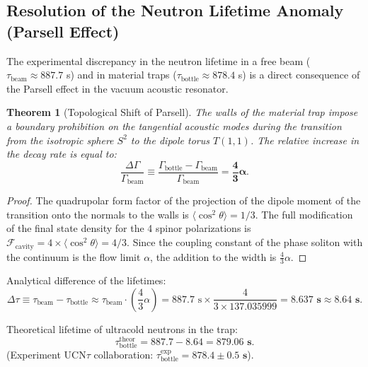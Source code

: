 \documentclass[12pt,a4paper]{article}
\newtheorem{theorem}{Theorem}
\begin{document}
\subsection{Resolution of the Neutron Lifetime Anomaly (Parsell Effect)}
The experimental discrepancy in the neutron lifetime in a free beam ($\tau_{\text{beam}} \approx 887.7$ s) and in material traps ($\tau_{\text{bottle}} \approx 878.4$ s) is a direct consequence of the Parsell effect in the vacuum acoustic resonator.

\begin{theorem}[Topological Shift of Parsell]
The walls of the material trap impose a boundary prohibition on the tangential acoustic modes during the transition from the isotropic sphere $S^2$ to the dipole torus $T(1,1)$. The relative increase in the decay rate is equal to:
\begin{equation}
\frac{\Delta \Gamma}{\Gamma_{\mathrm{beam}}} \equiv \frac{\Gamma_{\mathrm{bottle}} - \Gamma_{\mathrm{beam}}}{\Gamma_{\mathrm{beam}}} = \mathbf{\frac{4}{3} \alpha}.
\end{equation}
\end{theorem}
															
\begin{proof}
The quadrupolar form factor of the projection of the dipole moment of the transition onto the normals to the walls is $\langle \cos^2\theta \rangle = 1/3$. The full modification of the final state density for the 4 spinor polarizations is $\mathcal{F}_{\text{cavity}} = 4 \times \langle \cos^2\theta \rangle = 4/3$. Since the coupling constant of the phase soliton with the continuum is the flow limit $\alpha$, the addition to the width is $\frac{4}{3}\alpha$.
\end{proof}
															
Analytical difference of the lifetimes:
\begin{equation}
\Delta \tau \equiv \tau_{\text{beam}} - \tau_{\text{bottle}} \approx \tau_{\text{beam}} \cdot \left( \frac{4}{3} \alpha \right) = 887.7 \text{ s} \times \frac{4}{3 \times 137.035999} = \mathbf{8.637 \text{ s}} \approx \mathbf{8.64 \text{ s}}.
\end{equation}
															
Theoretical lifetime of ultracold neutrons in the trap:
\begin{equation}
\tau_{\text{bottle}}^{\text{theor}} = 887.7 - 8.64 = \mathbf{879.06 \text{ s}}.
\end{equation}
(Experiment UCN$\tau$ collaboration: $\tau_{\text{bottle}}^{\text{exp}} = \mathbf{878.4 \pm 0.5 \text{ s}}$).
															
\end{document}
